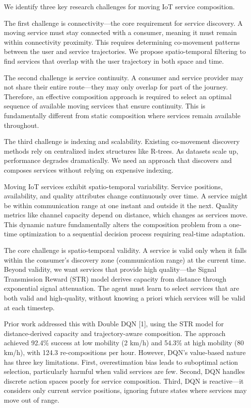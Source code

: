 We identify three key research challenges for moving IoT service
composition.

The first challenge is connectivity---the core requirement for service
discovery. A moving service must stay connected with a consumer, meaning
it must remain within connectivity proximity. This requires determining
co-movement patterns between the user and service trajectories. We
propose spatio-temporal filtering to find services that overlap with the
user trajectory in both space and time.

The second challenge is service continuity. A consumer and service
provider may not share their entire route---they may only overlap for
part of the journey. Therefore, an effective composition approach is
required to select an optimal sequence of available moving services that
ensure continuity. This is fundamentally different from static
composition where services remain available throughout.

The third challenge is indexing and scalability. Existing co-movement
discovery methods rely on centralized index structures like R-trees. As
datasets scale up, performance degrades dramatically. We need an
approach that discovers and composes services without relying on
expensive indexing.

Moving IoT services exhibit spatio-temporal variability. Service
positions, availability, and quality attributes change continuously over
time. A service might be within communication range at one instant and
outside it the next. Quality metrics like channel capacity depend on
distance, which changes as services move. This dynamic nature
fundamentally alters the composition problem from a one-time
optimization to a sequential decision process requiring real-time
adaptation.

The core challenge is spatio-temporal validity. A service is valid only
when it falls within the consumer's discovery zone (communication range)
at the current time. Beyond validity, we want services that provide high
quality---the Signal Transmission Reward (STR) model derives capacity
from distance through exponential signal attenuation. The agent must
learn to select services that are both valid and high-quality, without
knowing a priori which services will be valid at each timestep.

Prior work addressed this with Double DQN {[}1{]}, using the STR model
for distance-derived capacity and trajectory-aware composition. The
approach achieved 92.4\% success at low mobility (2 km/h) and 54.3\% at
high mobility (80 km/h), with 124.3 re-compositions per hour. However,
DQN's value-based nature has three key limitations. First,
overestimation bias leads to suboptimal action selection, particularly
harmful when valid services are few. Second, DQN handles discrete action
spaces poorly for service composition. Third, DQN is reactive---it
considers only current service positions, ignoring future states where
services may move out of range.

